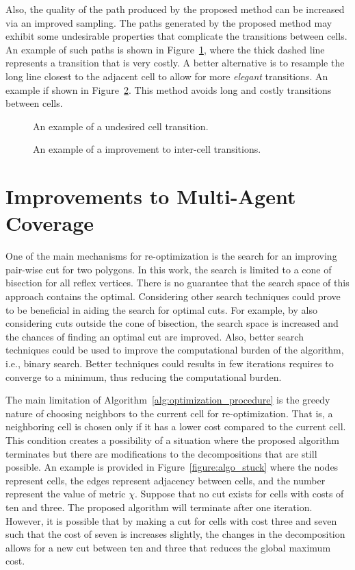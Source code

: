\documentclass[../main.tex]{subfiles}
\begin{document}
Also, the quality of the path produced by the proposed method can be increased via an improved sampling. The paths generated by the proposed method may exhibit some undesirable properties  that complicate the transitions between cells. An example of such paths is shown in Figure~\ref{fig:cell_transition}, where the thick dashed line represents a transition that is very costly. A better alternative is to resample the long line closest to the adjacent cell to allow for more \emph{elegant} transitions. An example if shown in Figure~\ref{fig:cell_transition_better}. This method avoids long and costly transitions between cells.

\begin{figure}
	\centering
	
	\caption{An example of a undesired cell transition.}
	\label{fig:cell_transition}
\end{figure}

\begin{figure}
	\centering
	
	\caption{An example of a improvement to inter-cell transitions.}
	\label{fig:cell_transition_better}
\end{figure}


\section{Improvements to Multi-Agent Coverage}
\label{section:future_multi}

One of the main mechanisms for re-optimization is the search for an improving pair-wise cut for two polygons. In this work, the search is limited to a cone of bisection for all reflex vertices. There is no guarantee that the search space of this approach contains the optimal. Considering other search techniques could prove to be beneficial in aiding the search for optimal cuts. For example, by also considering cuts outside the cone of bisection, the search space is increased and the chances of finding an optimal cut are improved. Also, better search techniques could be used to improve the computational burden of the algorithm, i.e., binary search. Better techniques could results in few iterations requires to converge to a minimum, thus reducing the computational burden.

The main limitation of Algorithm~\ref{alg:optimization_procedure} is the greedy nature of choosing neighbors to the current cell for re-optimization. That is, a neighboring cell is chosen only if it has a lower cost compared to the current cell. This condition creates a possibility of a situation where the proposed algorithm terminates but there are modifications to the decompositions that are still possible. An example is provided in Figure~\ref{figure:algo_stuck} where the nodes represent cells, the edges represent adjacency between cells, and the number represent the value of metric $\chi$. Suppose that no cut exists for cells with costs of ten and three. The proposed algorithm will terminate after one iteration. However, it is possible that by making a cut for cells with cost three and seven such that the cost of seven is increases slightly, the changes in the decomposition allows for a new cut between ten and three that reduces the global maximum cost.
\end{document}
